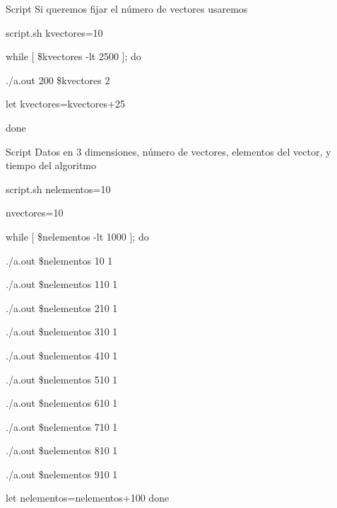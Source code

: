 \documentclass[compress]{beamer}
\begin{document}
\begin{frame}
	\begin{block}{Script}
		Si queremos fijar el n\'umero de vectores usaremos
	\end{block}
	
	\begin{exampleblock}{script.sh}
	kvectores=10

	while [ \$kvectores -lt 2500 ]; do
    
    		./a.out 200 \$kvectores 2
    	
    		let kvectores=kvectores+25

	done
	\end{exampleblock}
\end{frame}


\begin{frame}
	\begin{block}{Script}
	Datos en 3 dimensiones, número de vectores, elementos del vector, y tiempo del algoritmo
	\end{block}
	
	\begin{exampleblock}{script.sh}
	nelementos=10

	nvectores=10

	while [ \$nelementos -lt 1000 ]; do
   	
   		./a.out \$nelementos 10 1
   
   		./a.out \$nelementos 110 1
   
   		./a.out \$nelementos 210 1
   
   		./a.out \$nelementos 310 1
   		
   		./a.out \$nelementos 410 1
   
   		./a.out \$nelementos 510 1
   
   		./a.out \$nelementos 610 1
   
   		./a.out \$nelementos 710 1
   
   		./a.out \$nelementos 810 1
   
   		./a.out \$nelementos 910 1

   		let nelementos=nelementos+100
	done
	\end{exampleblock}
\end{frame}

\end{document}
